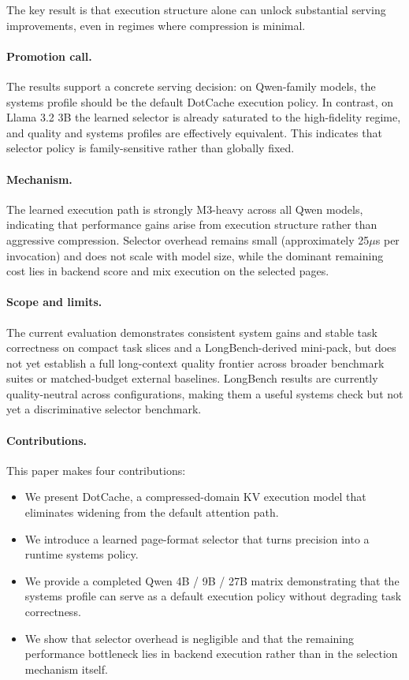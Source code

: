 \documentclass[11pt]{article}
\begin{document}
The key result is that execution structure alone can unlock substantial serving improvements, even in regimes where compression is minimal.

\paragraph{Promotion call.}
The results support a concrete serving decision: on Qwen-family models, the systems profile should be the default DotCache execution policy. In contrast, on Llama 3.2 3B the learned selector is already saturated to the high-fidelity regime, and quality and systems profiles are effectively equivalent. This indicates that selector policy is family-sensitive rather than globally fixed.

\paragraph{Mechanism.}
The learned execution path is strongly M3-heavy across all Qwen models, indicating that performance gains arise from execution structure rather than aggressive compression. Selector overhead remains small (approximately 25$\mu$s per invocation) and does not scale with model size, while the dominant remaining cost lies in backend score and mix execution on the selected pages.

\paragraph{Scope and limits.}
The current evaluation demonstrates consistent system gains and stable task correctness on compact task slices and a LongBench-derived mini-pack, but does not yet establish a full long-context quality frontier across broader benchmark suites or matched-budget external baselines. LongBench results are currently quality-neutral across configurations, making them a useful systems check but not yet a discriminative selector benchmark.

\paragraph{Contributions.}
This paper makes four contributions:
\begin{itemize}[leftmargin=1.5em]
\item We present DotCache, a compressed-domain KV execution model that eliminates widening from the default attention path.
\item We introduce a learned page-format selector that turns precision into a runtime systems policy.
\item We provide a completed Qwen 4B / 9B / 27B matrix demonstrating that the systems profile can serve as a default execution policy without degrading task correctness.
\item We show that selector overhead is negligible and that the remaining performance bottleneck lies in backend execution rather than in the selection mechanism itself.
\end{itemize}
\end{document}
